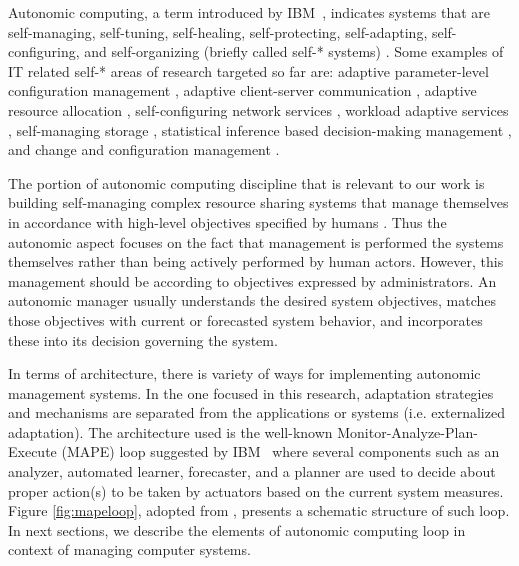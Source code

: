
Autonomic computing, a term introduced by IBM~\cite{computing2005architectural}, indicates systems that are
self-managing, self-tuning, self-healing, self-protecting, self-adapting, self-configuring, and self-organizing (briefly called self-* systems) \cite{babaoglu2005grassroots}. 
Some examples of IT related self-* areas of research targeted so far are:
adaptive parameter-level configuration management \cite{ensink2004coordinating, chang2000automatic, cangussu2004control},  
adaptive client-server communication \cite{loyall1998specifying, noble1997agile, balan2003tactics},  
adaptive resource allocation \cite{doyle_model-based_2003,lee1999scalable}, 
self-configuring network services \cite{huang2004building}, 
workload adaptive services \cite{menasce-accessing-ICAC-2004}, 
self-managing storage \cite{mesnier2004file}, 
statistical inference based decision-making management \cite{cohen2004correlating}, and
change and configuration management \cite{wang2003strider}. 

The portion of autonomic computing discipline that is relevant to our work is building self-managing complex resource sharing systems that manage themselves in accordance with high-level objectives specified by humans \cite{kephart_vision_2003}. Thus the autonomic aspect focuses on the fact that management is performed the systems themselves rather than being actively performed by human actors. However, this management should be according to objectives expressed by administrators. 
%
%
An autonomic manager usually understands the desired system objectives, matches those objectives with 
current or forecasted system behavior, and incorporates these into its decision governing the system. 

In terms of architecture, there is variety of ways for implementing autonomic management systems.
In the one focused in this research, adaptation strategies and mechanisms are separated from the applications or systems \cite{garlan2004rainbow, tesauro_utility_2004} (i.e. externalized adaptation). 
The architecture used is the well-known Monitor-Analyze-Plan-Execute (MAPE) loop suggested by IBM~\cite{computing2005architectural}  
where several components such as an analyzer, automated learner, forecaster, and a planner are used to decide about proper action(s) to be taken by actuators based on the current system measures. 
Figure \ref{fig:mapeloop}, adopted from \cite{mape-loop-pic}, presents a schematic structure of such loop.
In next sections, we describe the elements of autonomic computing loop in context of managing computer systems. 

